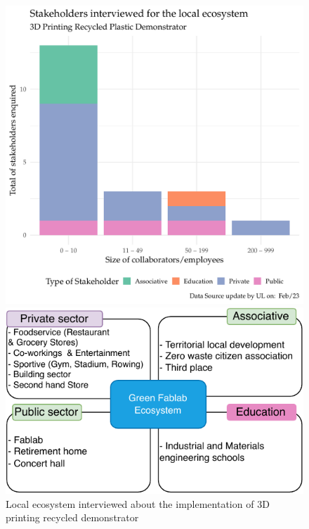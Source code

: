 \documentclass[
  11pt,
]{article}
\begin{document}
\begin{figure}

\begin{minipage}[b]{0.50\linewidth}

{\centering 

\includegraphics{figures/fedoua/Ecosystem-01.pdf}

}

\end{minipage}%
%
\begin{minipage}[b]{0.50\linewidth}

{\centering 

\includegraphics{figures/fedoua/Ecosystem-00.pdf}

}

\end{minipage}%

\caption{\label{fig-ecosystem}Local ecosystem interviewed about the
implementation of 3D printing recycled demonstrator}

\end{figure}
\end{document}
